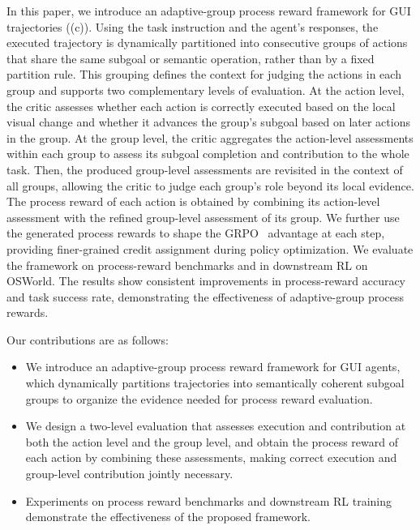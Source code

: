 In this paper, we introduce an adaptive-group process reward framework for GUI trajectories ((c)). Using the task instruction and the agent's responses, the executed trajectory is dynamically partitioned into consecutive groups of actions that share the same subgoal or semantic operation, rather than by a fixed partition rule. This grouping defines the context for judging the actions in each group and supports two complementary levels of evaluation. At the action level, the critic assesses whether each action is correctly executed based on the local visual change and whether it advances the group's subgoal based on later actions in the group.
At the group level, the critic aggregates the action-level assessments within each group to assess its subgoal completion and contribution to the whole task. Then, the produced group-level assessments are revisited in the context of all groups, allowing the critic to judge each group's role beyond its local evidence. The process reward of each action is obtained by combining its action-level assessment with the refined group-level assessment of its group. 
We further use the generated process rewards to shape the GRPO~\cite{shao2024deepseekmath} advantage at each step, providing finer-grained credit assignment during policy optimization.
We evaluate the framework on process-reward benchmarks and in downstream RL on OSWorld. The results show consistent improvements in process-reward accuracy and task success rate, demonstrating the effectiveness of adaptive-group process rewards.

Our contributions are as follows:
\begin{itemize}
    \item We introduce an adaptive-group process reward framework for GUI agents, which dynamically partitions trajectories into semantically coherent subgoal groups to organize the evidence needed for process reward evaluation.
    \item We design a two-level evaluation that assesses execution and contribution at both the action level and the group level, and obtain the process reward of each action by combining these assessments, making correct execution and group-level contribution jointly necessary.
    \item Experiments on process reward benchmarks and downstream RL training demonstrate the effectiveness of the proposed framework.
\end{itemize}

